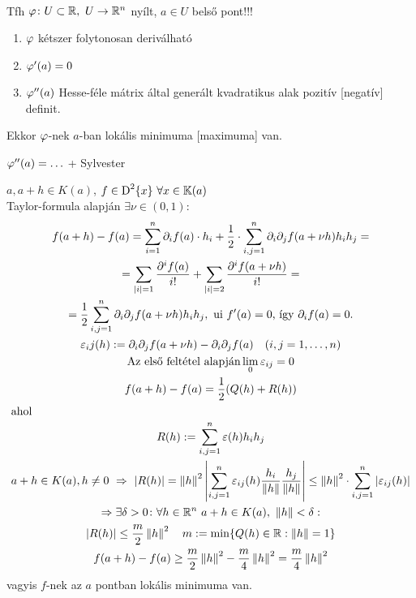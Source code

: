 \begin{te}\ \\
  Tfh $\varphi\colon U\subset\mathbb{R},\ U\to\mathbb{R}^n$ nyílt, $a\in U$ belső pont!!!
  {\listazjromai
    \begin{enumerate}
    \item $\varphi$ kétszer folytonosan deriválható
    \item $\varphi'(a)=0$
    \item $\varphi''(a)$ Hesse-féle mátrix által generált kvadratikus alak pozitív [negatív] definit.
    \end{enumerate}
}
Ekkor $\varphi$-nek $a$-ban lokális minimuma [maximuma] van.
\end{te}

\begin{megj} $\varphi''(a)=\ldots$ + Sylvester
\end{megj}
\begin{biz}$a,a+h\in K(a)$, $f\in\operatorname{D}^{2}\{x\}\ \forall x\in\mathbb{K}(a)$\\
  Taylor-formula alapján $\exists \nu\in(0,1)$:
\begin{gather*}
  f(a+h)-f(a)=\sum_{i=1}^n\partial_if(a)\cdot h_i+\dfrac12\cdot\sum_{i,j=1}^n\partial_i\partial_jf(a+\nu h)h_ih_j=
  \\ = \sum_{|i|=1}\dfrac{\partial^i f(a)}{i!} + \sum_{|i|=2}\dfrac{\partial^i f(a+\nu h)}{i!} =\\
  =\dfrac12\sum_{i,j=1}^n\partial_i\partial_jf(a+\nu h)h_ih_j,\text{ ui }f'(a)=0\text{, így }\partial_if(a)=0.\\
  \varepsilon_ij(h):=\partial_i\partial_jf(a+\nu h)-\partial_i\partial_jf(a)\quad(i,j=1,\dotsc,n)\\
  \text{Az első feltétel alapján} \lim_0\varepsilon_{ij}=0\\
  f(a+h)-f(a)=\dfrac12(Q(h)+R(h))\\
  \intertext{ahol}
  R(h):=\sum_{i,j=1}^n\varepsilon(h)h_ih_j\\
  a+h\in K(a), h\ne 0\ \Rightarrow\ \vert R(h)\vert=\left\Vert h\right\Vert^2\left\vert\sum_{i,j=1}^n\varepsilon_{ij}(h)\dfrac{h_i}{ 
    \left\Vert h\right\Vert}\dfrac{h_j}{\left\Vert h\right\Vert}\right\vert\leq\left\Vert h\right\Vert^2\cdot\sum_{i,j=1}^n|\varepsilon_{ij}(h)|\\
  \Rightarrow \exists \delta>0\colon \forall h\in\mathbb{R}^n\ a+h\in K(a),\  \left\Vert h\right\Vert<\delta:\\
  |R(h)|\leq \dfrac m2\left\Vert h\right\Vert^2\quad m:=\min\{Q(h)\in\mathbb{R}:\left\Vert h\right\Vert=1\}\\
  f(a+h)-f(a)\geq \frac m2\left\Vert h\right\Vert^2-\frac m4\left\Vert h\right\Vert^2=\frac m4\left\Vert h\right\Vert^2
\end{gather*}
vagyis $f$-nek az $a$ pontban lokális minimuma van.
\end{biz}

